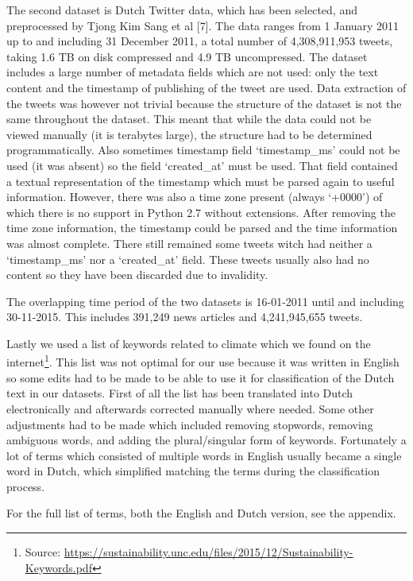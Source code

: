 \documentclass[paper=a4, fontsize=9px]{scrartcl} %
\numberwithin{equation}{section} %
\numberwithin{figure}{section} %
\numberwithin{table}{section} %
\begin{document}
\begin{multicols}{2}
The second dataset is Dutch Twitter data, which has been selected, and preprocessed by Tjong Kim Sang et al [7]. The data ranges from 1 January 2011 up to and including 31 December 2011, a total number of 4,308,911,953 tweets, taking 1.6 TB on disk compressed and 4.9 TB uncompressed. The dataset includes a large number of metadata fields which are not used: only the text content and the timestamp of publishing of the tweet are used. Data extraction of the tweets was however not trivial because the structure of the dataset is not the same throughout the dataset. This meant that while the data could not be viewed manually (it is terabytes large), the structure had to be determined programmatically. Also sometimes timestamp field `timestamp\_ms’ could not be used (it was absent) so the field `created\_at’ must be used. That field contained a textual representation of the timestamp which must be parsed again to useful information. However, there was also a time zone present (always `+0000’) of which there is no support in Python 2.7 without extensions. After removing the time zone information, the timestamp could be parsed and the time information was almost complete. There still remained some tweets witch had neither a `timestamp\_ms’ nor a `created\_at’ field. These tweets usually also had no content so they have been discarded due to invalidity. 

The overlapping time period of the two datasets is 16-01-2011 until and including 30-11-2015. This includes 391,249 news articles and 4,241,945,655 tweets.

Lastly we used a list of keywords related to climate which we found on the internet\footnote{Source: \url{https://sustainability.unc.edu/files/2015/12/Sustainability-Keywords.pdf}}. This list was not optimal for our use because it was written in English so some edits had to be made to be able to use it for classification of the Dutch text in our datasets. First of all the list has been translated into Dutch electronically and afterwards corrected manually where needed. Some other adjustments had to be made which included removing stopwords, removing ambiguous words, and adding the plural/singular form of keywords. Fortunately a lot of terms which consisted of multiple words in English usually became a single word in Dutch, which simplified matching the terms during the classification process. 

For the full list of terms, both the English and Dutch version, see the appendix.


\end{multicols}
\end{document}
